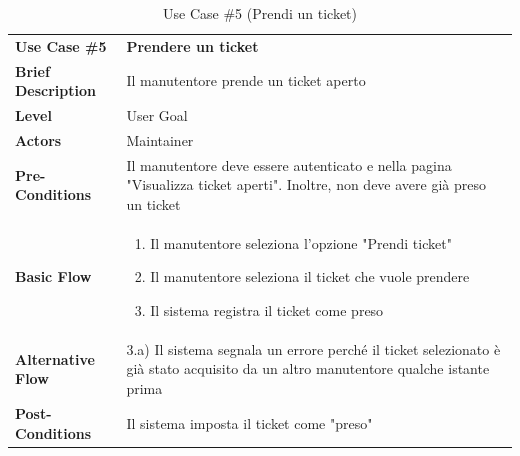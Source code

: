 		\begin{table}[h]
		\centering
		\setlength{\arrayrulewidth}{0.8pt} %
		
		\begin{tabular}{|l p{12cm}|}
			\hline
			
			\rowcolor{gray!25}
			\textbf{Use Case \#5} & \textbf{Prendere un ticket} \\ 
			\textbf{Brief Description} & Il manutentore prende un ticket aperto\\
			\textbf{Level} & User Goal \\ 
			\textbf{Actors} & Maintainer \\ 
			\textbf{Pre-Conditions} & Il manutentore deve essere autenticato e nella pagina "Visualizza ticket aperti". Inoltre, non deve avere già preso un ticket \\ 
			\textbf{Basic Flow} & \begin{enumerate}[label=\arabic*), leftmargin=*, before=\vspace{-0.7cm}, after=\vspace{-0.4cm}]
				\item Il manutentore seleziona l'opzione "Prendi ticket"
				\item Il manutentore seleziona il ticket che vuole prendere
				\item Il sistema registra il ticket come preso
			\end{enumerate} \\   
			\textbf{Alternative Flow} & 3.a) Il sistema segnala un errore perché il ticket selezionato è già stato acquisito da un altro manutentore qualche istante prima\\ 
			\textbf{Post-Conditions} & Il sistema imposta il ticket come "preso" \\ 
			
			\hline
		\end{tabular}
		
		\vspace{0.2cm}
		\caption{Use Case \#5 (Prendi un ticket)}
	\end{table}
	
